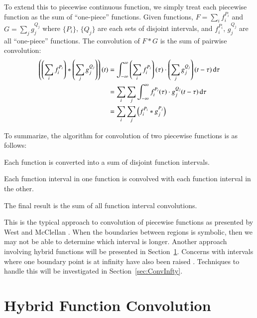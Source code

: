 To extend this to piecewise continuous function, 
we simply treat each piecewise function as the sum of ``one-piece'' functions.
Given functions, $F= \sum_i f_i^{P_i}$ and $G= \sum_j g_j^{Q_j}$ 
where $\{P_i\}$, $\{Q_j\}$ are each sets of disjoint intervals, and $f_i^{P_i}$, $g_j^{Q_j}$ are all ``one-piece'' functions.
The convolution of $F*G$ is the sum of pairwise convolution:
\begin{align}
	\label{eqn:ConvPiecewise}
	\left(\left(\sum_i f_i^{P_i}\right) * \left(\sum_j g_j^{Q_j}\right)\right) (t)
	&= \int_{-\infty}^\infty \left(\sum_i f_i^{P_i}\right)(\tau)\cdot \left(\sum_j g_j^{Q_j}\right)(t-\tau) \mathop{}\!\mathrm{d}\tau
	\notag\\&= \sum_i \sum_j \int_{-\infty}^\infty f_i^{P_i}(\tau) \cdot g_j^{Q_j}(t-\tau) \mathop{}\!\mathrm{d}\tau 
	\notag\\&= \sum_i \sum_j \left(f_i^{P_i} * g_j^{P_j}\right)
\end{align}

To summarize, the algorithm for convolution of two piecewise functions is as follows:
\begin{enumerate*}
	\item Each function is converted into a sum of disjoint function intervals.
	\item Each function interval in one function is convolved with each function interval in the other.
	\item The final result is the sum of all function interval convolutions.
\end{enumerate*}


This is the typical approach to convolution of piecewise functions as presented by West and McClellan  
\cite{west1993symbolic}.
When the boundaries between regions is symbolic, then we may not be able to determine which interval is longer.
Another approach involving hybrid functions will be presented in Section~\ref{sec:HFConvolution}. 
Concerns with intervals where one boundary point is at infinity have also been raised \cite{evans1994algorithms}.
Techniques to handle this will be investigated in Section~\ref{sec:ConvInfty}.




%
%
\section{Hybrid Function Convolution}
\label{sec:HFConvolution}

